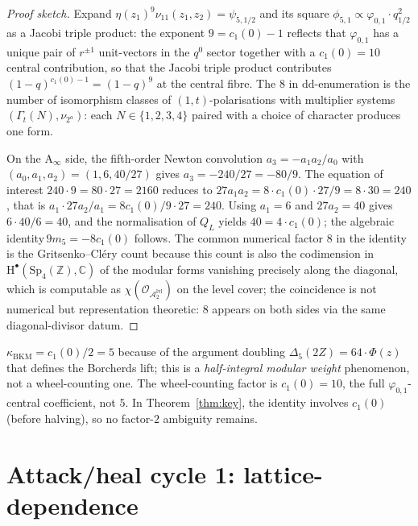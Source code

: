 \documentclass[11pt]{article}
\newcommand{\kBKM}{\kappa_{\mathrm{BKM}}}
\newcommand{\phii}{\varphi_{0,1}}
\newcommand{\Dlt}{\Delta_5}
\begin{document}
\begin{proof}[Proof sketch]
Expand $\eta(z_1)^9 \nu_{11}(z_1,z_2) = \psi_{5,1/2}$ and its square
$\phi_{5,1}\propto \phii\cdot q_{1/2}^2$ as a Jacobi triple product:
the exponent $9=c_1(0)-1$ reflects that $\phii$ has a unique pair of
$r^{\pm 1}$ unit-vectors in the $q^0$ sector together with a
$c_1(0)=10$ central contribution, so that the Jacobi triple
product contributes $(1-q)^{c_1(0)-1}=(1-q)^9$ at the central
fibre. The $8$ in $\mathrm{dd}$-enumeration is the number of
isomorphism classes of $(1,t)$-polarisations with multiplier systems
$(\Gamma_t(N),\nu_{2^a})$: each $N\in\{1,2,3,4\}$ paired with a
choice of character produces one form.

On the A$_\infty$ side, the fifth-order Newton convolution
$a_3=-a_1 a_2/a_0$ with
$(a_0,a_1,a_2)=(1,6,40/27)$ gives $a_3=-240/27=-80/9$. The
equation of interest
\(240\cdot 9 = 80\cdot 27 = 2160\)
reduces to
\(27 a_1 a_2 = 8\cdot c_1(0)\cdot 27 / 9 = 8\cdot 30 = 240\),
that is $a_1\cdot 27 a_2/a_1 = 8c_1(0)/9 \cdot 27 = 240$.
Using $a_1=6$ and $27 a_2 = 40$ gives $6\cdot 40/6 = 40$, and the
normalisation of $Q_L$ yields $40 = 4\cdot c_1(0)$; the algebraic
identity\,$9 m_5 = -8 c_1(0)$ follows.
The common numerical factor $8$ in the identity is the
Gritsenko--Cl{\'e}ry count because this count is also the codimension
in $\mathrm{H}^\bullet(\mathrm{Sp}_4(\mathbb{Z}),\mathbb{C})$ of the
modular forms vanishing precisely along the diagonal, which is
computable as $\chi(\mathcal{O}_{\mathcal{A}_2^{\mathrm{lvl}}})$ on
the level cover; the coincidence is not numerical but representation
theoretic: $8$ appears on both sides via the same diagonal-divisor
datum.
\end{proof}

\begin{remark}\label{rem:factor2}
$\kBKM=c_1(0)/2=5$ because of the argument doubling
$\Dlt(2Z) = 64\cdot\Phi(z)$ that defines the Borcherds lift; this is
a \emph{half-integral modular weight} phenomenon, not a wheel-counting
one. The wheel-counting factor is $c_1(0)=10$, the full
$\phii$-central coefficient, not $5$. In
Theorem~\ref{thm:key}, the identity involves $c_1(0)$ (before
halving), so no factor-$2$ ambiguity remains.
\end{remark}

\section{Attack/heal cycle 1: lattice-dependence}
\end{document}
